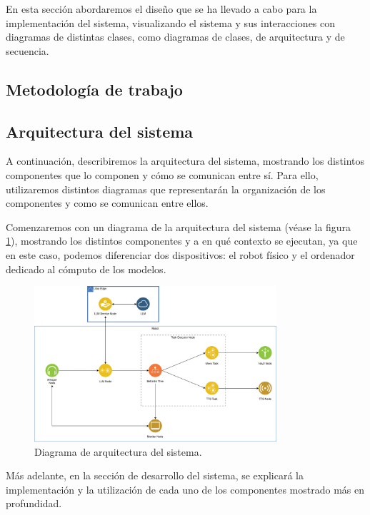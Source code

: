 \documentclass[../main.tex]{subfiles}
\begin{document}
En esta sección abordaremos el diseño que se ha llevado a cabo para la implementación del sistema, visualizando el sistema y sus interacciones con diagramas de distintas clases, como diagramas
de clases, de arquitectura y de secuencia. 

\subsection{Metodología de trabajo}

\subsection{Arquitectura del sistema}
A continuación, describiremos la arquitectura del sistema, mostrando los distintos componentes que lo componen y cómo se comunican entre sí. Para ello, utilizaremos distintos diagramas que representarán la organización de los componentes y como se comunican entre ellos. 

Comenzaremos con un diagrama de la arquitectura del sistema (véase la figura \ref{fig:diseno_architecture}), mostrando los distintos componentes y a en qué contexto se ejecutan, ya que en este caso, podemos diferenciar dos dispositivos: el robot físico y el ordenador dedicado al cómputo de los modelos.

\begin{figure}[H]
    \centering
    \includegraphics[width=0.8\textwidth]{images/diseno_architecture.png}
    \caption{Diagrama de arquitectura del sistema.}\label{fig:diseno_architecture}
\end{figure}

Más adelante, en la sección de desarrollo del sistema, se explicará la implementación y la utilización de cada uno de los componentes mostrado más en profundidad.
\end{document}

